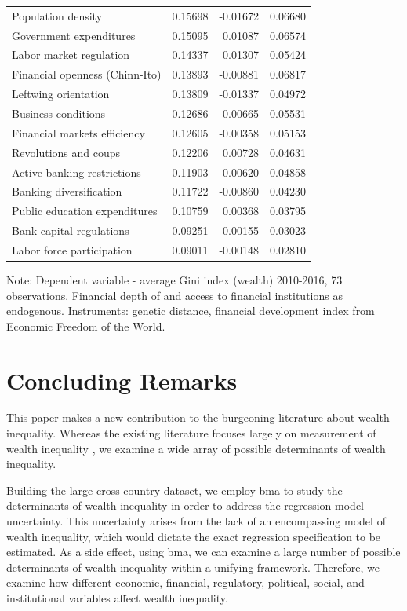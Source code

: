 \documentclass[a4paper,11pt]{article}
\begin{document}
\begin{table}[!ht]
\begin{threeparttable}
\begin{tabular}{lrrr}
		Population density & 0.15698 & -0.01672 & 0.06680 \\ 
		Government expenditures & 0.15095 & 0.01087 & 0.06574 \\ 
		Labor market regulation & 0.14337 & 0.01307 & 0.05424 \\ 
		Financial openness (Chinn-Ito) & 0.13893 & -0.00881 & 0.06817 \\ 
		Leftwing orientation & 0.13809 & -0.01337 & 0.04972 \\ 
		Business conditions & 0.12686 & -0.00665 & 0.05531 \\ 
		Financial markets efficiency & 0.12605 & -0.00358 & 0.05153 \\ 
		Revolutions and coups & 0.12206 & 0.00728 & 0.04631 \\ 
		Active banking restrictions & 0.11903 & -0.00620 & 0.04858 \\ 
		Banking diversification & 0.11722 & -0.00860 & 0.04230 \\ 
		Public education expenditures & 0.10759 & 0.00368 & 0.03795 \\ 
		Bank capital regulations & 0.09251 & -0.00155 & 0.03023 \\ 
		Labor force participation & 0.09011 & -0.00148 & 0.02810 \\ 
		\bottomrule
	\end{tabular}
\begin{tablenotes}
\item Note: Dependent variable - average Gini index (wealth) 2010-2016, 73 observations. Financial depth of and access to financial institutions as endogenous. Instruments: genetic distance, financial development index from Economic Freedom of the World.
\end{tablenotes}
\end{threeparttable}
\end{table}

\section{Concluding Remarks}
\label{sec:conclusion}

This paper makes a new contribution to the burgeoning literature about wealth inequality. Whereas the existing literature focuses largely on measurement of wealth inequality \citep{alvaredoetal2013,daviesetal2011,pikettyandzucman2014,SaezZucman2016}, we examine a wide array of possible determinants of wealth inequality. 

Building the large cross-country dataset, we employ \ac{bma} to study the determinants of wealth inequality in order to address the regression model uncertainty. This uncertainty arises from the lack of an encompassing model of wealth inequality, which would dictate the exact regression specification to be estimated. As a side effect, using \ac{bma}, we can examine a large number of possible determinants of wealth inequality within a unifying framework. Therefore, we examine how different economic, financial, regulatory, political, social, and institutional variables affect wealth inequality.  
\end{document}
